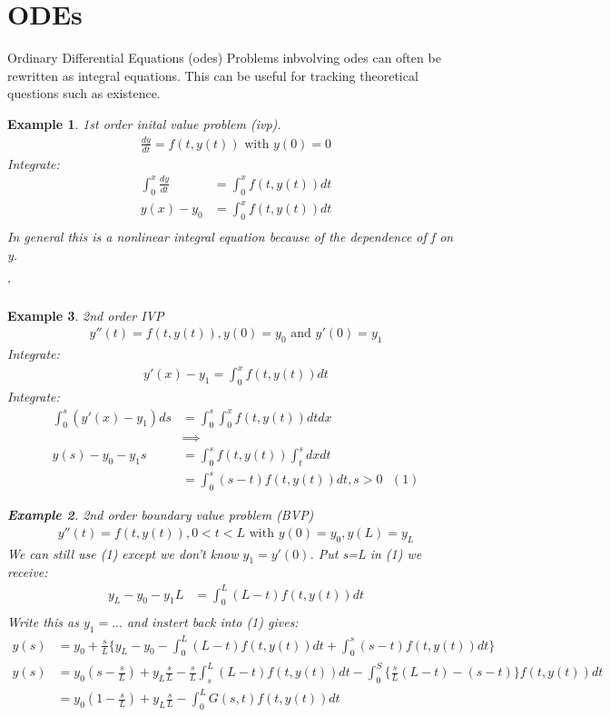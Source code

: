 \documentclass[10pt, oneside]{article}
\newtheorem{example}{Example}
\begin{document}
\section{ODEs}
Ordinary Differential Equations (odes)
Problems inbvolving odes can often be rewritten as integral equations. This can be useful for tracking theoretical questions such as existence.
\begin{example}
    1st order inital value problem (ivp).
    \begin{align*}
        \frac{dy}{dt} = f(t,y(t)) \text{ with } y(0) = 0 
    \end{align*}
    Integrate:
    \begin{align*}
        \int_{0}^{x}\frac{dy}{dt} & = \int_{0}^{x}f(t,y(t))dt\\
        y(x) - y_{0} &= \int_{0}^{x}f(t,y(t))dt \\
    \end{align*}
    In general this is a nonlinear integral equation because of the dependence of f on y. 
\end{example}'
\begin{example}
2nd order IVP
\begin{align*}
    y''(t) = f(t,y(t)), y(0) = y_{0} \text{ and } y'(0) = y_{1} 
\end{align*}
Integrate:
\begin{align*}
    y'(x) - y_{1} = \int_{0}^{x}f(t,y(t))dt
\end{align*}
Integrate:
\begin{align*}
    \int_{0}^{s}(y'(x) - y_{1})ds &= \int_{0}^{s}\int_{0}^{x}f(t,y(t))dt dx \\
    & \implies \\
    y(s) - y_{0} - y_{1} s & = \int_{0}^{s}f(t,y(t))\int_{t}^{s}  dx dt\\
    & = \int_{0}^{s}(s-t)f(t,y(t))dt, s> 0\text{    } (1) 
\end{align*}
\begin{example}
    2nd order boundary value problem (BVP)
    \begin{align*}
        y''(t) =f(t,y(t)), 0<t<L \text{ with } y(0) = y_{0}, y(L) = y_{L}
    \end{align*}
    We can still use (1) except we don't know $y_{1} = y'(0)$. Put s=L in (1) we receive:
    \begin{align*}
        y_{L} - y_{0} - y_{1} L & = \int_{0}^{L}(L-t)f(t,y(t))dt \\
    \end{align*}
    Write this as $y_{1} = ...$ and instert back into (1) gives:
    \begin{align*}
        y(s) & = y_{0} + \frac{s}{L} \{ y_{L} - y_{0} - \int_{0}^{L}(L-t) f(t,y(t))dt + \int_{0}^{s}(s-t) f(t,y(t))dt\} \\
        y(s) & = y_{0}(s-\frac{s}{L})+ y_{L}\frac{s}{L}  - \frac{s}{L} \int_{s}^{L} (L-t)f(t,y(t))dt - \int_{0}^{S}\{\frac{s}{L}(L-t) - (s-t)\} f(t,y(t))dt \\
        & = y_{0} (1-\frac{s}{L}) + y_{L} \frac{s}{L} - \int_{0}^{L}G(s,t)f(t,y(t))dt \\
    \end{align*}
\end{example}
\end{example}
\end{document}

